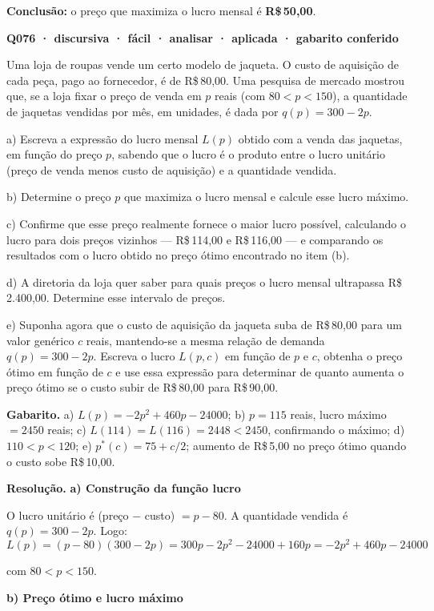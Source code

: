 \documentclass[11pt,a4paper]{article}
\begin{document}
\textbf{Conclusão:} o preço que maximiza o lucro mensal é \textbf{R\$\,50,00}.

\bigskip\noindent\textbf{Q076 · discursiva · fácil · analisar · aplicada · gabarito conferido}\par\nopagebreak
Uma loja de roupas vende um certo modelo de jaqueta. O custo de aquisição de cada peça, pago ao fornecedor, é de R\$\,80,00. Uma pesquisa de mercado mostrou que, se a loja fixar o preço de venda em $p$ reais (com $80 < p < 150$), a quantidade de jaquetas vendidas por mês, em unidades, é dada por $q(p) = 300 - 2p$.

a) Escreva a expressão do lucro mensal $L(p)$ obtido com a venda das jaquetas, em função do preço $p$, sabendo que o lucro é o produto entre o lucro unitário (preço de venda menos custo de aquisição) e a quantidade vendida.

b) Determine o preço $p$ que maximiza o lucro mensal e calcule esse lucro máximo.

c) Confirme que esse preço realmente fornece o maior lucro possível, calculando o lucro para dois preços vizinhos — R\$\,114,00 e R\$\,116,00 — e comparando os resultados com o lucro obtido no preço ótimo encontrado no item (b).

d) A diretoria da loja quer saber para quais preços o lucro mensal ultrapassa R\$\,2.400,00. Determine esse intervalo de preços.

e) Suponha agora que o custo de aquisição da jaqueta suba de R\$\,80,00 para um valor genérico $c$ reais, mantendo-se a mesma relação de demanda $q(p) = 300-2p$. Escreva o lucro $L(p,c)$ em função de $p$ e $c$, obtenha o preço ótimo em função de $c$ e use essa expressão para determinar de quanto aumenta o preço ótimo se o custo subir de R\$\,80,00 para R\$\,90,00.

\textbf{Gabarito.} a) $L(p) = -2p^2+460p-24000$; b) $p=115$ reais, lucro máximo $= 2450$ reais; c) $L(114)=L(116)=2448 < 2450$, confirmando o máximo; d) $110 < p < 120$; e) $p^*(c) = 75 + c/2$; aumento de R\$\,5,00 no preço ótimo quando o custo sobe R\$\,10,00.

\textbf{Resolução.} \textbf{a) Construção da função lucro}

O lucro unitário é (preço $-$ custo) $= p - 80$. A quantidade vendida é $q(p) = 300-2p$. Logo:
$$L(p) = (p-80)(300-2p) = 300p - 2p^2 - 24000 + 160p = -2p^2 + 460p - 24000$$

com $80 < p < 150$.

\textbf{b) Preço ótimo e lucro máximo}
\end{document}
